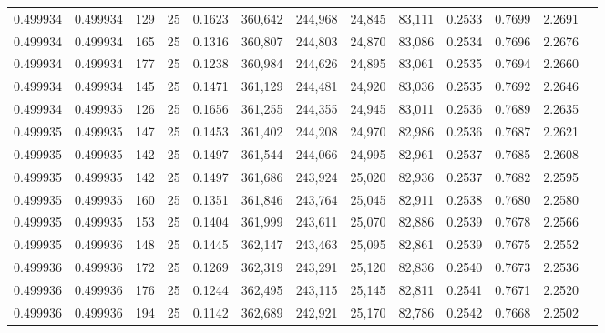 \begin{tabular}{rrrrrrrrrrrrr}
0.499934 & 0.499934 &   129 &  25 &                                     0.1623 & 360,642 & 244,968 &  24,845 &  83,111 & 0.2533 & 0.7699 & 2.2691 \\
0.499934 & 0.499934 &   165 &  25 &                                     0.1316 & 360,807 & 244,803 &  24,870 &  83,086 & 0.2534 & 0.7696 & 2.2676 \\
0.499934 & 0.499934 &   177 &  25 &                                     0.1238 & 360,984 & 244,626 &  24,895 &  83,061 & 0.2535 & 0.7694 & 2.2660 \\
0.499934 & 0.499934 &   145 &  25 &                                     0.1471 & 361,129 & 244,481 &  24,920 &  83,036 & 0.2535 & 0.7692 & 2.2646 \\
0.499934 & 0.499935 &   126 &  25 &                                     0.1656 & 361,255 & 244,355 &  24,945 &  83,011 & 0.2536 & 0.7689 & 2.2635 \\
0.499935 & 0.499935 &   147 &  25 &                                     0.1453 & 361,402 & 244,208 &  24,970 &  82,986 & 0.2536 & 0.7687 & 2.2621 \\
0.499935 & 0.499935 &   142 &  25 &                                     0.1497 & 361,544 & 244,066 &  24,995 &  82,961 & 0.2537 & 0.7685 & 2.2608 \\
0.499935 & 0.499935 &   142 &  25 &                                     0.1497 & 361,686 & 243,924 &  25,020 &  82,936 & 0.2537 & 0.7682 & 2.2595 \\
0.499935 & 0.499935 &   160 &  25 &                                     0.1351 & 361,846 & 243,764 &  25,045 &  82,911 & 0.2538 & 0.7680 & 2.2580 \\
0.499935 & 0.499935 &   153 &  25 &                                     0.1404 & 361,999 & 243,611 &  25,070 &  82,886 & 0.2539 & 0.7678 & 2.2566 \\
0.499935 & 0.499936 &   148 &  25 &                                     0.1445 & 362,147 & 243,463 &  25,095 &  82,861 & 0.2539 & 0.7675 & 2.2552 \\
0.499936 & 0.499936 &   172 &  25 &                                     0.1269 & 362,319 & 243,291 &  25,120 &  82,836 & 0.2540 & 0.7673 & 2.2536 \\
0.499936 & 0.499936 &   176 &  25 &                                     0.1244 & 362,495 & 243,115 &  25,145 &  82,811 & 0.2541 & 0.7671 & 2.2520 \\
0.499936 & 0.499936 &   194 &  25 &                                     0.1142 & 362,689 & 242,921 &  25,170 &  82,786 & 0.2542 & 0.7668 & 2.2502 \\

\end{tabular}

